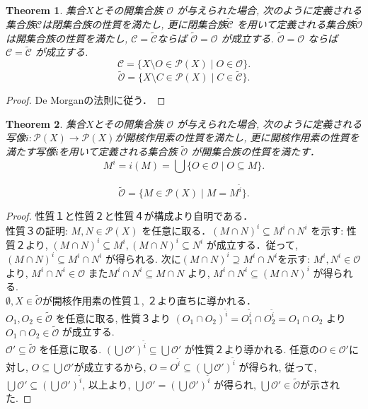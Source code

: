\documentclass[lualatex]{ltjsbook}
\newtheorem{theorem}{Theorem}[chapter]
\theoremstyle{remark}
\theoremstyle{plain}
\begin{document}
\begin{theorem}
集合$X$とその開集合族 $\mathcal{O}$ が与えられた場合,  
次のように定義される集合族$\mathcal{C}$は閉集合族の性質を満たし,  
更に閉集合族$\tilde{\mathcal{C}}$ を用いて定義される集合族$\tilde{\mathcal{O}}$は開集合族の性質を満たし, 
$\mathcal{C} = \tilde{\mathcal{C}}$ならば $\tilde{\mathcal{O}} = \mathcal{O}$  が成立する. $\tilde{\mathcal{O}} = \mathcal{O}$ ならば $\mathcal{C} = \tilde{\mathcal{C}}$ が成立する.
	 \[
	\mathcal{C} = \{X \setminus O \in \mathcal{P}(X) \mid O \in \mathcal{O} \} 
	.\] 
	\[
		\tilde{\mathcal{O}} = \{ X \setminus C \in \mathcal{P}(X)  \mid C \in \tilde{\mathcal{C}} \} 
	.\] 
\end{theorem}

\begin{proof}
	De Morganの法則に従う．	
\end{proof}

\begin{theorem}
	集合$X$とその開集合族 $\mathcal{O}$ が与えられた場合,  
	次のように定義される写像$i: \mathcal{P}(X) \to  \mathcal{P}(X)$が開核作用素の性質を満たし,  
	更に開核作用素の性質を満たす写像$\tilde{i}$を用いて定義される集合族 $\tilde{\mathcal{O}}$ が開集合族の性質を満たす．
	\[
	M^{i}= i(M) = \bigcup \{O \in \mathcal{O} \mid O \subseteq M\} 
	.\] 

	\[
		\tilde{\mathcal{O}} =\{ M \in \mathcal{P}(X) \mid M = M^{\tilde{i}}\} 
	.\] 
\end{theorem}

\begin{proof}
	性質１と性質２と性質４が構成より自明である．\\
	性質３の証明: $M ,  N \in \mathcal{P}(X)$ を任意に取る．$\left( M \cap N \right) ^{i} \subseteq M^{i} \cap N^{i}$ を示す: 性質２より,  $\left( M \cap N \right)^{i} \subseteq M^{i},  \left( M \cap N \right) ^{i} \subseteq N^{i} $ が成立する．従って,  $\left( M \cap  N \right) ^{i } \subseteq M^{i} \cap  N^{i}$ 
	が得られる. 次に$(M\cap N)^{i} \supseteq M^{i}  \cap  N ^{i}$を示す: $M^{i} ,  N^{i} \in \mathcal{O}$より, $ M^{i} \cap  N^{ i} \in \mathcal{O}$ また$M^{i} \cap N^{i} \subseteq M \cap N$ より,  $M^{i} \cap N^{i} \subseteq \left( M \cap N \right) ^{i}$ が得られる.\\
	$\emptyset ,  X \in \tilde{\mathcal{O}}$が開核作用素の性質１,  ２より直ちに導かれる．\\
	$O_1,  O_2 \in \tilde{\mathcal{O}}$ を任意に取る,  性質３より
	$(O_1 \cap O_2)^{\tilde{i}} = O_1 ^{\tilde{i}} \cap O_2^{\tilde{i}} = O_1 \cap O_2$ より $O_1 \cap O_2 \in \tilde{\mathcal{O}}$ が成立する.\\
	$\mathcal{O}' \subseteq \tilde{\mathcal{O}}$ を任意に取る. 
	$\left(\bigcup \mathcal{O}' \right) ^{\tilde{i}} \subseteq \bigcup \mathcal{O}'  $ が性質２より導かれる. 
	任意の$O \in \mathcal{O}'$に対し,  $O \subseteq \bigcup \mathcal{O}' $が成立するから,  
	$O = O^{\tilde{i}} \subseteq  \left(\bigcup \mathcal{O}'\right) ^{\tilde{i}}$ が得られ,  
	従って,  $\bigcup \mathcal{O}' \subseteq \left(\bigcup \mathcal{O}' \right)^{\tilde{i}}  $, 
	以上より,  $\bigcup \mathcal{O}' = \left( \bigcup \mathcal{O}'  \right) ^{\tilde{i}}$ が得られ,  
	$\bigcup \mathcal{O}' \in \tilde{\mathcal{O}}$が示された.
\end{proof}
\end{document}
